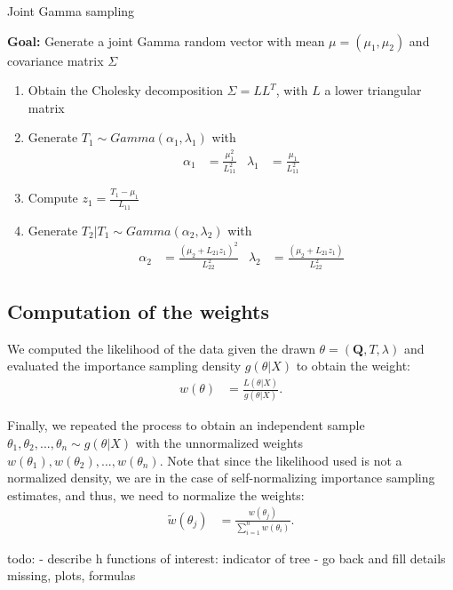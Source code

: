 \documentclass[conference]{IEEEtran}
\begin{document}
\begin{algorithm}
\caption{Joint Gamma sampling}
\textbf{Goal:} Generate a joint Gamma random vector with mean $\mu=(\mu_1, \mu_2)$
and covariance matrix $\Sigma$
\begin{enumerate}
\item{Obtain the Cholesky decomposition $\Sigma=LL^T$, with $L$ a
    lower triangular matrix}
\item{Generate $T_1 \sim Gamma(\alpha_1, \lambda_1)$ with 
\begin{align*}
\alpha_1 &= \frac{\mu_1^2}{L_{11}^2} & \lambda_1 &= \frac{\mu_1}{L_{11}^2}
\end{align*}}
\item{Compute $z_1 = \frac{T_1-\mu_1}{L_{11}}$}
\vspace{0.25cm}
\item{Generate $T_2|T_1 \sim Gamma(\alpha_2, \lambda_2)$ with
\begin{align*}
\alpha_2 &= \frac{(\mu_2+L_{21}z_1)^2}{L_{22}^2} & \lambda_2 &= \frac{(\mu_2+L_{21}z_1)}{L_{22}^2}
\end{align*}}
\end{enumerate}
\end{algorithm}


\subsection*{Computation of the weights}
We computed the likelihood of the data given the drawn $\theta = (\mathbf{Q}, T,
\lambda)$ and evaluated the importance sampling density $g(\theta|X)$
to obtain the weight:
\begin{align*}
w(\theta) &= \frac{L(\theta|X)}{g(\theta|X)}.
\end{align*}

Finally, we repeated the process to obtain an independent sample
$\theta_1, \theta_2,...,\theta_n \sim g(\theta|X)$ with the
unnormalized weights $w(\theta_1), w(\theta_2),...,w(\theta_n)$. Note
that since the likelihood used is not a normalized density, we are in
the case of self-normalizing importance sampling estimates, and thus,
we need to normalize the weights:
\begin{align*}
\tilde{w}(\theta_j) &= \frac{w(\theta_j)}{\sum_{i=1}^n w(\theta_i)}.
\end{align*}


todo:
- describe h functions of interest: indicator of tree
- go back and fill details missing, plots, formulas




\end{document}
